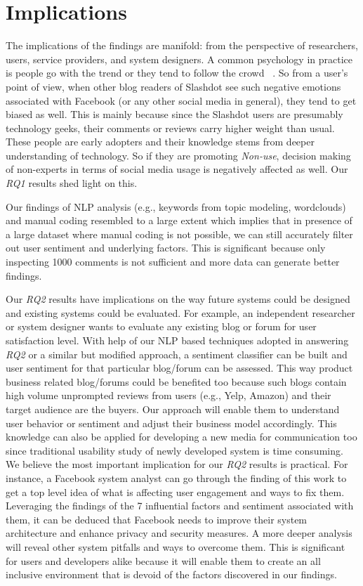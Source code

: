 \section{Implications}
\label{sec:implications}

The implications of the findings are manifold: from the perspective of researchers, users, service providers, and system designers. A common psychology in practice is people go with the trend or they tend to follow the crowd ~\cite{gilbert2009blogs}. So from a user's point of view, when other blog readers of Slashdot see such negative emotions associated with Facebook (or any other social media in general), they tend to get biased as well. This is mainly because since the Slashdot users are presumably technology geeks, their comments or reviews carry higher weight than usual. These people are early adopters and their knowledge stems from deeper understanding of technology. So if they are promoting \textit{Non-use}, decision making of non-experts in terms of social media usage is negatively affected as well. Our \textit{RQ1} results shed light on this. 

Our findings of NLP analysis (e.g., keywords from topic modeling, wordclouds) and manual coding resembled to a large extent which implies that in presence of a large dataset where manual coding is not possible, we can still accurately filter out user sentiment and underlying factors. This is significant because only inspecting 1000 comments is not sufficient and more data can generate better findings. 

Our \textit{RQ2} results have implications on the way future systems could be designed and existing systems could be evaluated. For example, an independent researcher or system designer wants to evaluate any existing blog or forum for user satisfaction level. With help of our NLP based techniques adopted in answering \textit{RQ2} or a similar but modified approach, a sentiment classifier can be built and user sentiment for that particular blog/forum can be assessed. This way product business related blog/forums could be benefited too because such blogs contain high volume unprompted reviews from users (e.g., Yelp, Amazon) and their target audience are the buyers. Our approach will enable them to understand user behavior or sentiment and adjust their business model accordingly. This knowledge can also be applied for developing a new media for communication too since traditional usability study of newly developed system is time consuming. We believe the most important implication for our \textit{RQ2} results is practical. For instance, a Facebook system analyst can go through the finding of this work to get a top level idea of what is affecting user engagement and ways to fix them. Leveraging the findings of the 7 influential factors and sentiment associated with them, it can be deduced that Facebook needs to improve their system architecture and enhance privacy and security measures. A more deeper analysis will reveal other system pitfalls and ways to overcome them. This is significant for users and developers alike because it will enable them to create an all inclusive environment that is devoid of the factors discovered in our findings. 